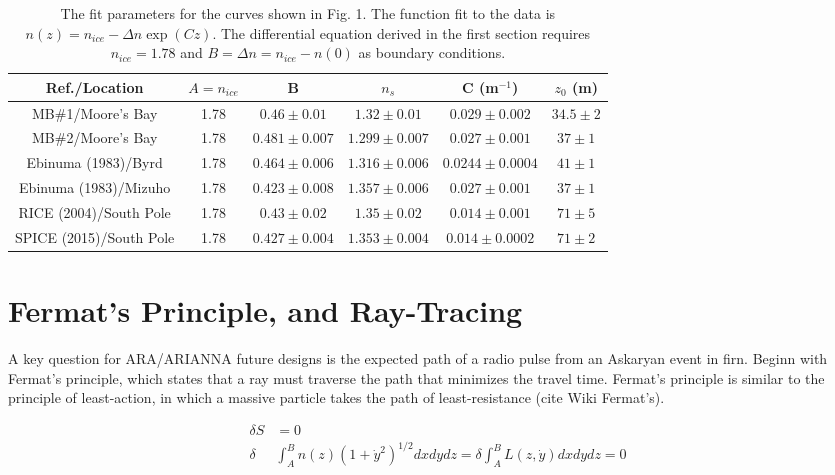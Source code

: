 \documentclass[12pt]{article}
\begin{document}
\begin{table}[ht]
\centering
\begin{tabular}{| c | c | c | c | c | c |}\hline
Ref./Location & $A=n_{ice}$ & B  & $n_s$ & C (m$^{-1}$) & $z_0$ (m)\\ \hline
MB\#1/Moore's Bay & 1.78 & $0.46\pm0.01$ & $1.32\pm0.01$ & $0.029\pm0.002$ & $34.5\pm2$ \\ \hline
MB\#2/Moore's Bay & 1.78 & $0.481\pm0.007$ & $1.299\pm0.007$ & $0.027\pm0.001$ & $37\pm1$ \\ \hline
Ebinuma (1983)/Byrd & 1.78 & $0.464\pm0.006$ & $1.316\pm0.006$ & $0.0244\pm0.0004$ & $41\pm1$ \\ \hline
Ebinuma (1983)/Mizuho & 1.78 & $0.423\pm0.008$ & $1.357\pm0.006$ & $0.027\pm0.001$ & $37\pm1$ \\ \hline\hline
RICE (2004)/South Pole & 1.78 & $0.43\pm0.02$ & $1.35\pm0.02$ & $0.014\pm0.001$ & $71\pm5$ \\ \hline
SPICE (2015)/South Pole & 1.78 & $0.427\pm0.004$ & $1.353\pm0.004$ & $0.014\pm0.0002$ & $71\pm2$ \\ \hline
\end{tabular}
\caption{\label{tab:tab0} The fit parameters for the curves shown in Fig. 1.  The function fit to the data is $n(z) = n_{ice} -\Delta n \exp(Cz)$.  The differential equation derived in the first section requires $n_{ice} = 1.78$ and $B = \Delta n = n_{ice} - n(0)$ as boundary conditions.}
\end{table}

\section{Fermat's Principle, and Ray-Tracing}

A key question for ARA/ARIANNA future designs is the expected path of a radio pulse from an Askaryan event in firn.  Beginn with Fermat's principle, which states that a ray must traverse the path that minimizes the travel time.  Fermat's principle is similar to the principle of least-action, in which a massive particle takes the path of least-resistance (cite Wiki Fermat's).

\begin{align}
\delta S &= 0 \\
\delta &\int_A^B n(z)(1+\dot{y}^2)^{1/2} dx dy dz = \delta \int_A^B L(z,\dot{y}) dx dy dz = 0
\end{align}
\end{document}
